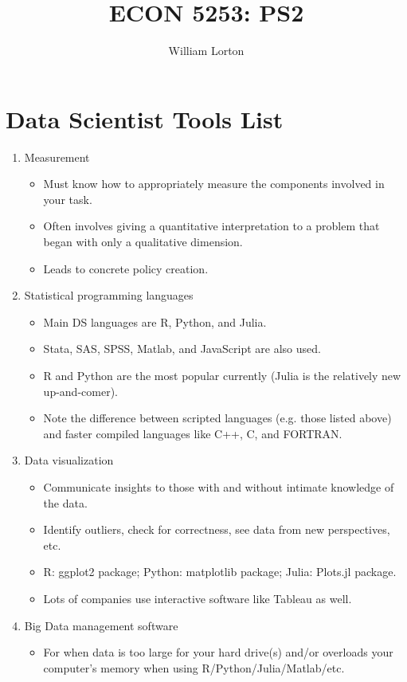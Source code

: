 \documentclass{homeworg}
\title{ECON 5253: PS2}
\author{William Lorton}
\begin{document}
\maketitle

\section*{Data Scientist Tools List}

\begin{enumerate}
   \item Measurement
   \begin{itemize}
     \item Must know how to appropriately measure the components involved in your task.
     \item Often involves giving a quantitative interpretation to a problem that began with only a qualitative dimension.
     \item Leads to concrete policy creation.
   \end{itemize}
   \item Statistical programming languages
   \begin{itemize}
    \item Main DS languages are R, Python, and Julia.
    \item Stata, SAS, SPSS, Matlab, and JavaScript are also used.
    \item R and Python are the most popular currently (Julia is the relatively new up-and-comer).
    \item Note the difference between scripted languages (e.g. those listed above) and faster compiled languages like C++, C, and FORTRAN.
   \end{itemize}
   \item Data visualization
   \begin{itemize}
    \item Communicate insights to those with and without intimate knowledge of the data.
    \item Identify outliers, check for correctness, see data from new perspectives, etc.
    \item R: ggplot2 package; Python: matplotlib package; Julia: Plots.jl package.
    \item Lots of companies use interactive software like Tableau as well.
   \end{itemize}
   \item Big Data management software
   \begin{itemize}
       \item For when data is too large for your hard drive(s) and/or overloads your computer's memory when using R/Python/Julia/Matlab/etc.

\end{itemize}
\end{enumerate}
\end{document}
